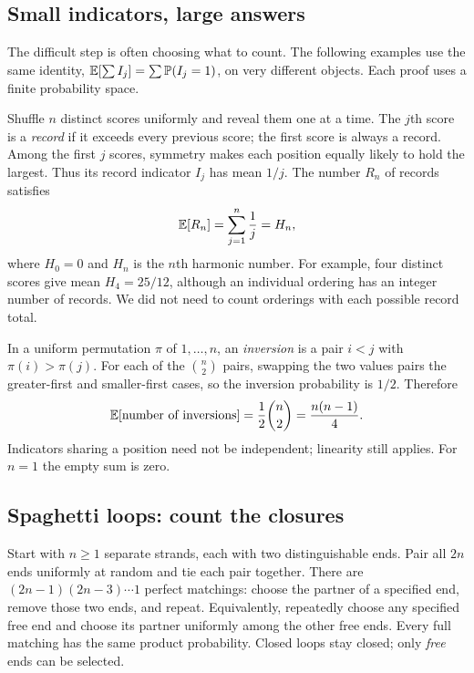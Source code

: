\subsection{Small indicators, large answers}
\label{sec:linearity-examples}

The difficult step is often choosing what to count. The following examples
use the same identity, $\mathbb E[\sum I_j]=\sum\mathbb P(I_j=1)$, on very different
objects. Each proof uses a finite probability space.

\begin{example}
Shuffle $n$ distinct scores uniformly and reveal them one at a time.
The $j$th score is a \emph{record} if it exceeds every previous score;
the first score is always a record. Among the first $j$ scores, symmetry
makes each position equally likely to hold the largest. Thus its record
indicator $I_j$ has mean $1/j$. The number $R_n$ of records satisfies
\[
\mathbb E[R_n]=\sum_{j=1}^n\frac1j=H_n,
\]
where $H_0=0$ and $H_n$ is the $n$th harmonic number. For example,
four distinct scores give mean $H_4=25/12$, although an individual
ordering has an integer number of records. We did not need to count
orderings with each possible record total.
\end{example}

\begin{example}
In a uniform permutation $\pi$ of $1,\ldots,n$, an \emph{inversion}
is a pair $i<j$ with $\pi(i)>\pi(j)$. For each of the $\binom n2$
pairs, swapping the two values pairs the greater-first and smaller-first
cases, so the inversion probability is $1/2$. Therefore
\[
\mathbb E[\text{number of inversions}]=\frac12\binom n2=\frac{n(n-1)}4.
\]
Indicators sharing a position need not be independent; linearity still
applies. For $n=1$ the empty sum is zero.
\end{example}

\subsection{Spaghetti loops: count the closures}
\label{sec:spaghetti-loops}

Start with $n\ge1$ separate strands, each with two distinguishable ends.
Pair all $2n$ ends uniformly at random and tie each pair together. There
are $(2n-1)(2n-3)\cdots1$ perfect matchings: choose the partner of a
specified end, remove those two ends, and repeat. Equivalently, repeatedly
choose any specified free end and choose its partner uniformly among
the other free ends. Every full matching has the same product probability.
Closed loops stay closed; only \emph{free} ends can be selected.

